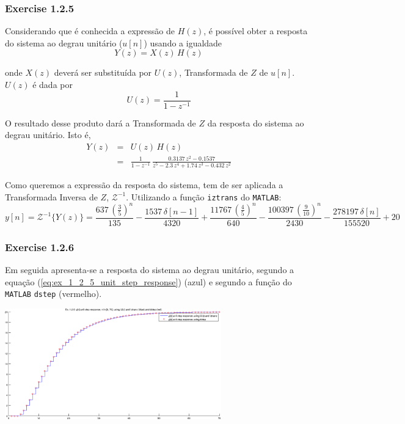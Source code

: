 \documentclass[a4paper]{article}
\begin{document}
\subsubsection{Exercise 1.2.5}
\label{subsubsec:ex_1_2_5}
\noindent Considerando que é conhecida a expressão de $H(z)$, é possível obter a resposta do sistema ao degrau unitário ($u[n]$) usando a igualdade
\begin{equation}
	\label{eq:ex_1_2_5_system_response}
	Y(z) = X(z) \, H(z)
\end{equation}

\noindent onde $X(z)$ deverá ser substituída por $U(z)$, Transformada de $Z$ de $u[n]$. $U(z)$ é dada por
\begin{equation}
	\label{eq:ex_1_2_5_unit_step_response_ztrans}
	U(z) = \frac{1}{1 - z^{-1}}
\end{equation}

\noindent O resultado desse produto dará a Transformada de $Z$ da resposta do sistema ao degrau unitário. Isto é,
\begin{eqnarray}
	\label{eqnarr:ex_1_2_5_unit_step_response_ztrans_replace}
	Y(z) & = & U(z) \, H(z) \\
	& = & \frac{1}{1 - z^{-1}} \, \frac{0.3137 \, z^{2} - 0.1537}{z^{5} - 2.3 \, z^{4} + 1.74 \, z^{3} - 0.432 \, z^{2}}
\end{eqnarray}

\noindent Como queremos a expressão da resposta do sistema, tem de ser aplicada a Transformada Inversa de $Z$, $\mathcal{Z}^{-1}$. Utilizando a função \texttt{iztrans} do \texttt{MATLAB}:
\begin{equation}
	\label{eq:ex_1_2_5_unit_step_response}
	y[n] = \mathcal{Z}^{-1}\{Y(z)\} = \frac{637 \, \left(\frac{3}{5}\right)^n}{135} - \frac{1537 \, \delta[n - 1]}{4320} + \frac{11767 \, \left(\frac{4}{5}\right)^n}{640} - \frac{100397 \, \left(\frac{9}{10}\right)^n}{2430} - \frac{278197 \, \delta[n]}{155520} + 20
\end{equation}

\subsubsection{Exercise 1.2.6}
\noindent Em seguida apresenta-se a resposta do sistema ao degrau unitário, segundo a equação (\ref{eq:ex_1_2_5_unit_step_response}) (azul) e segundo a função do \texttt{MATLAB} \texttt{dstep} (vermelho).
\begin{center}
	\includegraphics[width=0.70\textwidth]{images/ex1_2_6.png}
	\label{fig:ex1_2_6}
\end{center}
\end{document}
